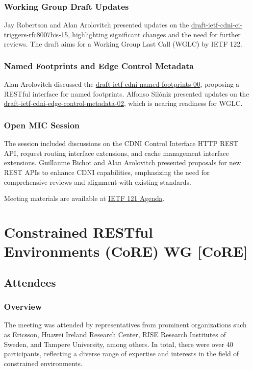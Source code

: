 \documentclass{article}
\begin{document}
\subsubsection{Working Group Draft Updates}
Jay Robertson and Alan Arolovitch presented updates on the \href{https://datatracker.ietf.org/doc/html/draft-ietf-cdni-ci-triggers-rfc8007bis-15}{draft-ietf-cdni-ci-triggers-rfc8007bis-15}, highlighting significant changes and the need for further reviews. The draft aims for a Working Group Last Call (WGLC) by IETF 122.

\subsubsection{Named Footprints and Edge Control Metadata}
Alan Arolovitch discussed the \href{https://datatracker.ietf.org/doc/html/draft-ietf-cdni-named-footprints-00}{draft-ietf-cdni-named-footprints-00}, proposing a RESTful interface for named footprints. Alfonso Silóniz presented updates on the \href{https://datatracker.ietf.org/doc/html/draft-ietf-cdni-edge-control-metadata-02}{draft-ietf-cdni-edge-control-metadata-02}, which is nearing readiness for WGLC.

\subsubsection{Open MIC Session}
The session included discussions on the CDNI Control Interface HTTP REST API, request routing interface extensions, and cache management interface extensions. Guillaume Bichot and Alan Arolovitch presented proposals for new REST APIs to enhance CDNI capabilities, emphasizing the need for comprehensive reviews and alignment with existing standards.

Meeting materials are available at \href{https://datatracker.ietf.org/meeting/121/agenda}{IETF 121 Agenda}.






\newpage

\section{Constrained RESTful Environments (CoRE) WG [CoRE]}

\subsection{Attendees}

\subsubsection{Overview}
The meeting was attended by representatives from prominent organizations such as Ericsson, Huawei Ireland Research Center, RISE Research Institutes of Sweden, and Tampere University, among others. In total, there were over 40 participants, reflecting a diverse range of expertise and interests in the field of constrained environments.
\end{document}
